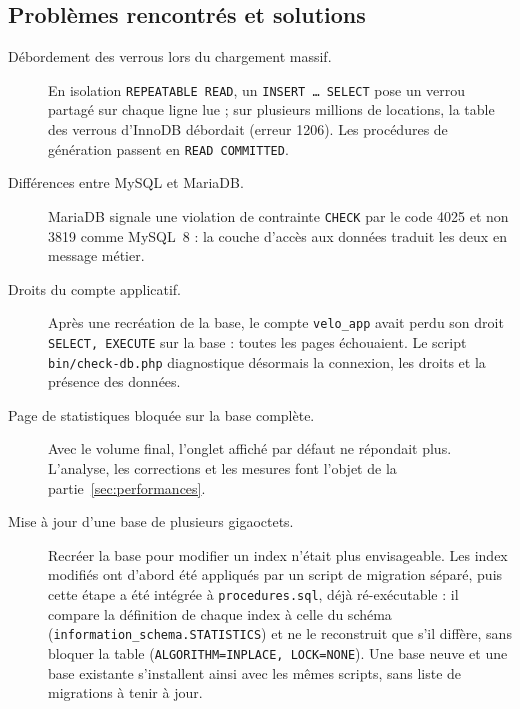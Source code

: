 \subsection{Problèmes rencontrés et solutions}

\begin{description}
	\item[Débordement des verrous lors du chargement massif.] En isolation \texttt{REPEATABLE READ}, un \texttt{INSERT \ldots{} SELECT} pose un verrou partagé sur chaque ligne lue ; sur plusieurs millions de locations, la table des verrous d'InnoDB débordait (erreur 1206). Les procédures de génération passent en \texttt{READ COMMITTED}.
	\item[Différences entre MySQL et MariaDB.] MariaDB signale une violation de contrainte \texttt{CHECK} par le code 4025 et non 3819 comme MySQL~8 : la couche d'accès aux données traduit les deux en message métier.
	\item[Droits du compte applicatif.] Après une recréation de la base, le compte \texttt{velo\_app} avait perdu son droit \texttt{SELECT, EXECUTE} sur la base : toutes les pages échouaient. Le script \texttt{bin/check-db.php} diagnostique désormais la connexion, les droits et la présence des données.
	\item[Page de statistiques bloquée sur la base complète.] Avec le volume final, l'onglet affiché par défaut ne répondait plus. L'analyse, les corrections et les mesures font l'objet de la partie~\ref{sec:performances}.
	\item[Mise à jour d'une base de plusieurs gigaoctets.] Recréer la base pour modifier un index n'était plus envisageable. Les index modifiés ont d'abord été appliqués par un script de migration séparé, puis cette étape a été intégrée à \texttt{procedures.sql}, déjà ré-exécutable : il compare la définition de chaque index à celle du schéma (\texttt{information\_schema.STATISTICS}) et ne le reconstruit que s'il diffère, sans bloquer la table (\texttt{ALGORITHM=INPLACE, LOCK=NONE}). Une base neuve et une base existante s'installent ainsi avec les mêmes scripts, sans liste de migrations à tenir à jour.
\end{description}
